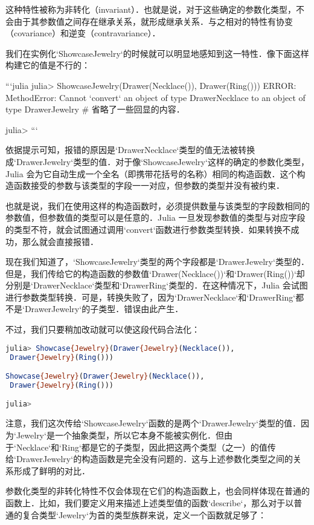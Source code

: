 这种特性被称为非转化（invariant）．也就是说，对于这些确定的参数化类型，不会由于其参数值之间存在继承关系，就形成继承关系．与之相对的特性有协变（covariance）和逆变（contravariance）．

我们在实例化`Showcase{Jewelry}`的时候就可以明显地感知到这一特性．像下面这样构建它的值是不行的：

```julia
julia> Showcase{Jewelry}(Drawer(Necklace()), Drawer(Ring()))
ERROR: MethodError: Cannot `convert` an object of type Drawer{Necklace} 
to an object of type Drawer{Jewelry}
# 省略了一些回显的内容．

julia> 
```

依据提示可知，报错的原因是`Drawer{Necklace}`类型的值无法被转换成`Drawer{Jewelry}`类型的值．对于像`Showcase{Jewelry}`这样的确定的参数化类型，Julia 会为它自动生成一个全名（即携带花括号的名称）相同的构造函数．这个构造函数接受的参数与该类型的字段一一对应，但参数的类型并没有被约束．

也就是说，我们在使用这样的构造函数时，必须提供数量与该类型的字段数相同的参数值，但参数值的类型可以是任意的．Julia 一旦发现参数值的类型与对应字段的类型不符，就会试图通过调用`convert`函数进行参数类型转换．如果转换不成功，那么就会直接报错．

现在我们知道了，`Showcase{Jewelry}`类型的两个字段都是`Drawer{Jewelry}`类型的．但是，我们传给它的构造函数的参数值`Drawer(Necklace())`和`Drawer(Ring())`却分别是`Drawer{Necklace}`类型和`Drawer{Ring}`类型的．在这种情况下，Julia 会试图进行参数类型转换．可是，转换失败了，因为`Drawer{Necklace}`和`Drawer{Ring}`都不是`Drawer{Jewelry}`的子类型．错误由此产生．

不过，我们只要稍加改动就可以使这段代码合法化：

\begin{lstlisting}[language=julia]
julia> Showcase{Jewelry}(Drawer{Jewelry}(Necklace()),
 Drawer{Jewelry}(Ring()))

Showcase{Jewelry}(Drawer{Jewelry}(Necklace()),
 Drawer{Jewelry}(Ring()))

julia> 
\end{lstlisting}

注意，我们这次传给`Showcase{Jewelry}`函数的是两个`Drawer{Jewelry}`类型的值．因为`Jewelry`是一个抽象类型，所以它本身不能被实例化．但由于`Necklace`和`Ring`都是它的子类型，因此把这两个类型（之一）的值传给`Drawer{Jewelry}`的构造函数是完全没有问题的．这与上述参数化类型之间的关系形成了鲜明的对比．

参数化类型的非转化特性不仅会体现在它们的构造函数上，也会同样体现在普通的函数上．比如，我们要定义用来描述上述类型值的函数`describe`，那么对于以普通的复合类型`Jewelry`为首的类型族群来说，定义一个函数就足够了：


